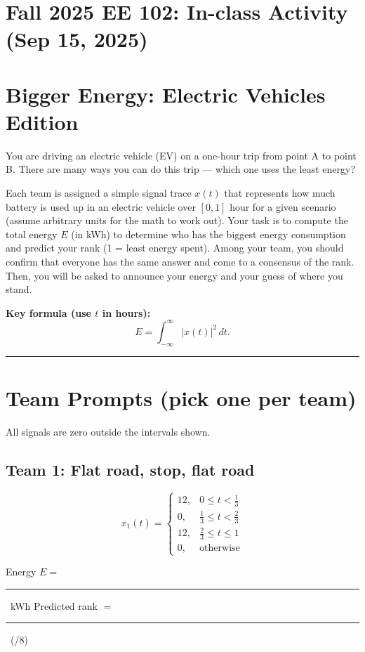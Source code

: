 \documentclass[11pt]{article}
\newcommand{\Eblank}{\rule{3cm}{0.4pt}}
\newcommand{\Rankblank}{\rule{3cm}{0.4pt}}
\begin{document}
\section*{Fall 2025 EE 102: In-class Activity (Sep 15, 2025)}

\section*{Bigger Energy: Electric Vehicles Edition}
You are driving an electric vehicle (EV) on a one-hour trip from point A to point B. There are many ways you can do this trip --- which one uses the least energy?
\medskip

\noindent Each team is assigned a simple signal trace \(x(t)\)  that represents how much battery is used up in an electric vehicle over \([0,1]\) hour for a given scenario (assume arbitrary units for the math to work out). Your task is to compute the total energy \(E\) (in \si{kWh}) to determine who has the biggest energy consumption and predict your rank (1 = least energy spent). Among your team, you should confirm that everyone has the same answer and come to a consensus of the rank. Then, you will be asked to announce your energy and your guess of where you stand.

\medskip

\textbf{Key formula (use \(t\) in hours):}
\[
E  = \int_{-\infty}^{\infty} |x(t)|^2 \,dt.
\]

\bigskip
\hrule
\bigskip

\section*{Team Prompts (pick one per team)}
All signals are zero outside the intervals shown.

\subsection*{Team 1: Flat road, stop, flat road}
\[
x_1(t)=
\begin{cases}
12, & 0 \le t < \tfrac{1}{3} \\
0, & \tfrac{1}{3} \le t < \tfrac{2}{3} \\
12, & \tfrac{2}{3} \le t \le 1 \\
0, & \text{otherwise}
\end{cases}
\]
\begin{tcolorbox}[title=Team 1: Record your results]
Energy \(E=\) \Eblank\ \si{kWh} \quad\quad Predicted rank \(=\) \Rankblank\ (/8)
\end{tcolorbox}
\end{document}
